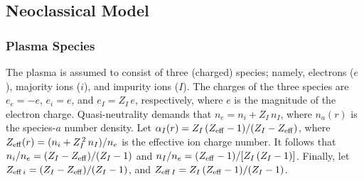 \documentclass[12pt,prb,aps]{revtex4-1}
\begin{document}
\subsection{Neoclassical Model}\label{appb}
\subsubsection{Plasma Species}\label{a3}
The plasma is assumed to consist of three (charged) species; namely,  electrons ($e$), majority ions ($i$), and impurity ions
($I$).  The charges of the  three species are $e_e=-e$, $e_i= e$, and $e_I=Z_I\,e$, respectively, where
$e$ is the magnitude of the electron charge. 
Quasi-neutrality demands that
$n_e= n_i+ Z_I\,n_I$, where $n_a(r)$ is the species-$a$ number density. 
 Let 
$\alpha_I(r) =Z_I\,(Z_{\rm eff}-1)/(Z_I-Z_{\rm eff})$,
where 
$Z_{\rm eff}(r) = (n_i+Z_I^{\,2}\,n_I)/n_e$
is the effective ion charge number. It follows that
$n_i/n_e = (Z_I-Z_{\rm eff})/(Z_I-1)$
and
$n_I/n_e= (Z_{\rm eff}-1)/[Z_I\,(Z_I-1)]$. Finally, let $Z_{{\rm eff}\,i}= (Z_I-Z_{\rm eff})/(Z_I-1)$, and
$Z_{{\rm eff}\,I}=Z_I\,(Z_{\rm eff}-1)/(Z_I-1)$. 
\end{document}
